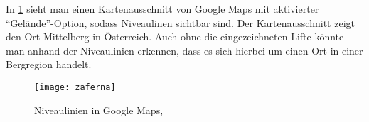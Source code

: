 In \cref{fig:zaferna} sieht man einen Kartenausschnitt von Google Maps\texttrademark{} mit aktivierter \enquote{Gelände}-Option, sodass Niveaulinen sichtbar sind.
Der Kartenausschnitt zeigt den Ort Mittelberg in Österreich.
Auch ohne die eingezeichneten Lifte könnte man anhand der Niveaulinien erkennen, dass es sich hierbei um einen Ort in einer Bergregion handelt.
\begin{figure}[hbtp]
	\Centering
	\texttt{[image: zaferna]}
	\caption{Niveaulinien in Google Maps\texttrademark, \cite{googlemaps}}\label{fig:zaferna}
\end{figure}
